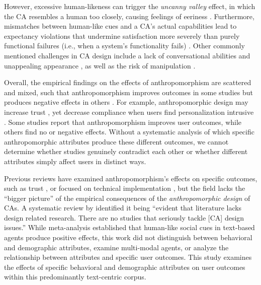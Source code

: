 \documentclass[preprint,review,12pt,authoryear,nonatbib]{elsarticle}
\begin{document}
However, excessive human-likeness can trigger the \textit{uncanny valley} effect, in which the CA resembles a human too closely, causing feelings of eeriness \parencite{mori_bukimi_1970,soni2024chatbot}. Furthermore, mismatches between human-like cues and a CA's actual capabilities lead to expectancy violations that undermine satisfaction more severely than purely functional failures (i.e., when a system's functionality fails) \parencite{ischen2024communication,qu2024chatbot}. Other commonly mentioned challenges in CA design include a lack of conversational abilities and unappealing appearance \parencite{diederich_design_2022}, as well as the risk of manipulation \parencite{chaves2021should}.

Overall, the empirical findings on the effects of anthropomorphism are scattered and mixed, such that anthropomorphism improves outcomes in some studies \parencite{go2019humanizing} but produces negative effects in others \parencite{crolic2022blame}. For example, anthropomorphic design may increase trust \parencite{go2019humanizing,konya2023anthropomorphism}, yet decrease compliance when users find personalization intrusive \parencite{chen_you_2021}. Some studies report that anthropomorphism improves user outcomes, while others find no or negative effects. Without a systematic analysis of which specific anthropomorphic attributes produce these different outcomes, we cannot determine whether studies genuinely contradict each other or whether different attributes simply affect users in distinct ways.

Previous reviews have examined anthropomorphism's effects on specific outcomes, such as trust \parencite{bach2024systematic}, or focused on technical implementation \parencite{chen2024trends}, but the field lacks the ``bigger picture'' of the empirical consequences of the \textit{anthropomorphic design} of CAs. A systematic review by \textcite{rapp_human_2021} identified it being ``evident that literature lacks design related research. There are no studies that seriously tackle [CA] design issues.'' While \textcite{klein_effects_2025} meta-analysis established that human-like social cues in text-based agents produce positive effects, this work did not distinguish between behavioral and demographic attributes, examine multi-modal agents, or analyze the relationship between attributes and specific user outcomes. This study examines the effects of specific behavioral and demographic attributes on user outcomes within this predominantly text-centric corpus.
\end{document}
